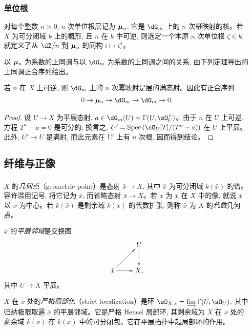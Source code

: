 \subsubsection{单位根}\label{I:2-2-4}

对每个整数 $n>0$, $n$ 次单位根层记为 ${\bm\mu}_n$, 它是 $\dG_m$ 上的 $n$ 次幂映射的核。若 $X$ 为可分闭域 $k$ 上的概形, 且 $n$ 在 $k$ 中可逆, 则选定一个本原 $n$ 次单位根 $\zeta\in k$, 就定义了从 $\dZ/n$ 到 ${\bm\mu}_n$ 的同构 $i\mapsto\zeta^i$。

以 ${\bm\mu}_n$ 为系数的上同调与以 $\dG_m$ 为系数的上同调之间的关系, 由下列定理导出的上同调正合序列给出。

\begin{theorem}[Kummer 理论]\label{I:2-2-5}
若 $n$ 在 $X$ 上可逆, 则 $\dG_m$ 上的 $n$ 次幂映射是层的满态射。因此有正合序列
\[
  0 \to \dmu_n \to \dG_m \to \dG_m \to 0\text{.}
\]
\end{theorem}
\begin{proof}
设 $U\to X$ 为平展态射, $a\in\dG_m(U)=\Gamma(U,\sO_U^\times)$。由于 $n$ 在 $U$ 上可逆, 方程 $T^n-a=0$ 是可分的; 换言之, $U'=\spec\left(\sO_U[T]/(T^n-a)\right)$ 在 $U$ 上平展。此外, $U'\to U$ 是满射, 而此元素在 $U'$ 上有 $n$ 次根, 因而得到结论。
\end{proof}

\subsection{纤维与正像}\label{I:2-3}

\subsubsection{}\label{I:2-3-1}

$X$ 的\emph{几何点}（geometric point）是态射 $\bar x\to X$, 其中 $\bar x$ 为可分闭域 $k(\bar x)$ 的谱。容许滥用记号, 将它记为 $\bar x$, 而省略态射 $\bar x\to X$。若 $x$ 为 $\bar x$ 在 $X$ 中的像, 就说 $\bar x$ 以 $x$ 为中心。若 $k(\bar x)$ 是剩余域 $k(x)$ 的代数扩张, 则称 $\bar x$ 为 $X$ 的\emph{代数}几何点。

$\bar x$ 的\emph{平展邻域}是交换图
\[\xymatrix{
  & U \ar[d] \\
  \bar x \ar[ur] \ar[r]
  & X\text{,}
}\]
其中 $U\to X$ 平展。

$X$ 在 $\bar x$ 处的\emph{严格局部化}（strict localization）是环 $\sO_{X,\bar x}=\varinjlim\Gamma(U,\sO_U)$, 其中归纳极限取遍 $\bar x$ 的平展邻域。它是严格 Hensel 局部环, 其剩余域为 $X$ 在 $x$ 处的剩余域 $k(x)$ 在 $k(\bar x)$ 中的可分闭包。它在平展拓扑中起局部环的作用。

